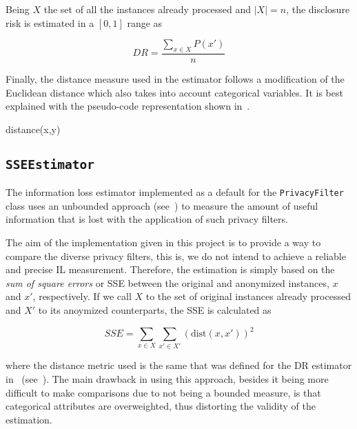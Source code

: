 Being $X$ the set of all the instances already processed and $\vert X \vert = n$, the disclosure risk is estimated in a $[0,1]$ range as

\begin{equation}
DR = \frac{\sum_{x \in X}P(x')}{n}
\end{equation}

Finally, the distance measure used in the estimator follows a modification of the Euclidean distance which also takes into account categorical variables. It is best explained with the pseudo-code representation shown in~.

\begin{procedure}[H]
\caption{distance(x,y)\label{al:distance}}
\end{procedure}

\subsection{\texttt{SSEEstimator}}
\label{Implementation:Estimators:SSE}

The information loss estimator implemented as a default for the \texttt{PrivacyFilter} class uses an unbounded approach (see~) to measure the amount of useful information that is lost with the application of such privacy filters.

The aim of the implementation given in this project is to provide a way to compare the diverse privacy filters, this is, we do not intend to achieve a reliable and precise IL measurement. Therefore, the estimation is simply based on the \textit{sum of square errors} or SSE between the original and anonymized instances, $x$ and $x'$, respectively. If we call $X$ to the set of original instances already processed and $X'$ to its anoymized counterparts, the SSE is calculated as

\begin{equation}
SSE = \sum_{x \in X} \sum_{x' \in X'} (\mathrm{dist}(x,x'))^2
\end{equation}

where the distance metric used is the same that was defined for the DR estimator in~ (see~). The main drawback in using this approach, besides it being more difficult to make comparisons due to not being a bounded measure, is that categorical attributes are overweighted, thus distorting the validity of the estimation.